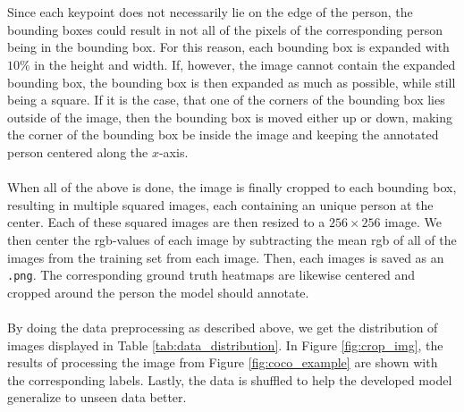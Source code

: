 \documentclass[./main.tex]{subfiles}
\begin{document}
\\
\\
Since each keypoint does not necessarily lie on the edge of the person, the bounding boxes could result in not all of the pixels of the corresponding person being in the bounding box. For this reason, each bounding box is expanded with $10\%$ in the height and width. If, however, the image cannot contain the expanded bounding box, the bounding box is then expanded as much as possible, while still being a square. If it is the case, that one of the corners of the bounding box lies outside of the image, then the bounding box is moved either up or down, making the corner of the bounding box be inside the image and keeping the annotated person centered along the $x$-axis. 
\\
\\
When all of the above is done, the image is finally cropped to each bounding box, resulting in multiple squared images, each containing an unique person at the center. Each of these squared images are then resized to a $256 \times 256$ image. We then center the rgb-values of each image by subtracting the mean rgb of all of the images from the training set from each image. Then, each images is saved as an \texttt{.png}. The corresponding ground truth heatmaps are likewise centered and cropped around the person the model should annotate.
\\
\\
By doing the data preprocessing as described above, we get the distribution of images displayed in Table \ref{tab:data_distribution}. In Figure \ref{fig:crop_img}, the results of processing the image from Figure \ref{fig:coco_example} are shown with the corresponding labels. Lastly, the data is shuffled to help the developed model generalize to unseen data better.
\end{document}
